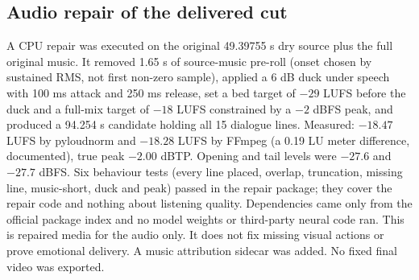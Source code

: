 \documentclass[11pt,a4paper]{article}
\begin{document}
\subsection{Audio repair of the delivered cut}
A CPU repair was executed on the original 49.39755 s dry source plus the full original music. It removed 1.65 s of source-music pre-roll (onset chosen by sustained RMS, not first non-zero sample), applied a 6 dB duck under speech with 100 ms attack and 250 ms release, set a bed target of $-29$ LUFS before the duck and a full-mix target of $-18$ LUFS constrained by a $-2$ dBFS peak, and produced a 94.254 s candidate holding all 15 dialogue lines. Measured: $-18.47$ LUFS by pyloudnorm and $-18.28$ LUFS by FFmpeg (a 0.19 LU meter difference, documented), true peak $-2.00$ dBTP. Opening and tail levels were $-27.6$ and $-27.7$ dBFS. Six behaviour tests (every line placed, overlap, truncation, missing line, music-short, duck and peak) passed in the repair package; they cover the repair code and nothing about listening quality. Dependencies came only from the official package index and no model weights or third-party neural code ran. This is repaired media for the audio only. It does not fix missing visual actions or prove emotional delivery. A music attribution sidecar was added. No fixed final video was exported.
\end{document}
